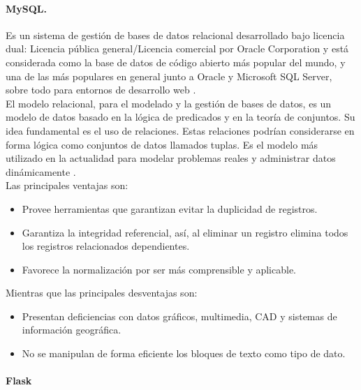 \documentclass[12pt, a4paper, titlepage]{report}
\begin{document}
            \paragraph{MySQL. \\}
            Es un sistema de gestión de bases de datos relacional desarrollado bajo licencia dual: Licencia pública general/Licencia comercial por Oracle Corporation y está considerada como la base de datos de código abierto más popular del mundo, y una de las más populares en general junto a Oracle y Microsoft SQL Server, sobre todo para entornos de desarrollo web \cite{refmysql}.\\
            
            El modelo relacional, para el modelado y la gestión de bases de datos, es un modelo de datos basado en la lógica de predicados y en la teoría de conjuntos.
            Su idea fundamental es el uso de relaciones. Estas relaciones podrían considerarse en forma lógica como conjuntos de datos llamados tuplas. Es el modelo más utilizado en la actualidad para modelar problemas reales y administrar datos dinámicamente \cite{refER}.\\
            
            Las principales ventajas son: 
            \begin{itemize}
                \item Provee herramientas que garantizan evitar la duplicidad de registros.
                \item Garantiza la integridad referencial, así, al eliminar un registro elimina todos los registros relacionados dependientes.
                \item Favorece la normalización por ser más comprensible y aplicable.
            \end{itemize}

            Mientras que las principales desventajas son: 
            \begin{itemize}
                \item Presentan deficiencias con datos gráficos, multimedia, CAD y sistemas de información geográfica.
                \item No se manipulan de forma eficiente los bloques de texto como tipo de dato.
            \end{itemize}
			
			\paragraph{Flask}
\end{document}
